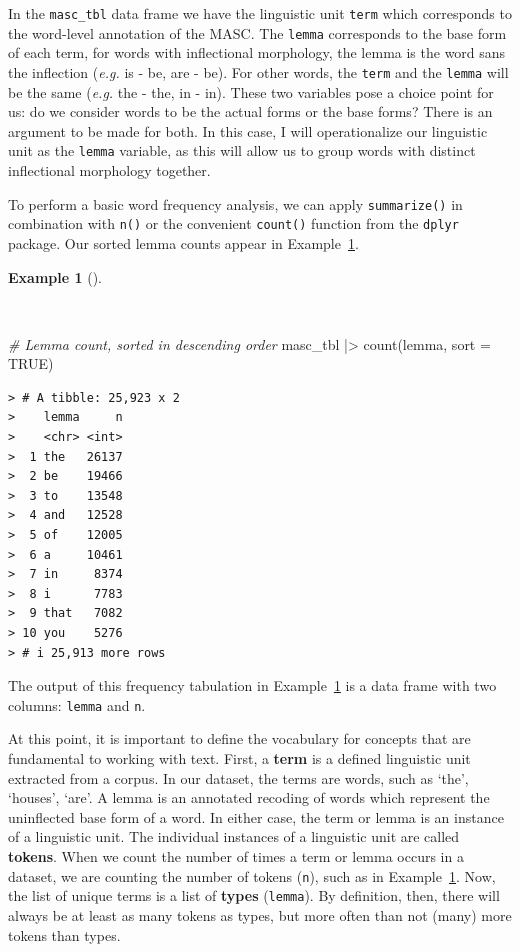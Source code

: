 \documentclass[
  letterpaper,
  DIV=11,
  numbers=noendperiod]{scrreprt}
\newenvironment{Shaded}{\begin{snugshade}}{\end{snugshade}}
\newcommand{\AttributeTok}[1]{\textcolor[rgb]{0.00,0.00,0.00}{#1}}
\newcommand{\CommentTok}[1]{\textcolor[rgb]{0.00,0.00,0.00}{\textit{#1}}}
\newcommand{\ConstantTok}[1]{\textcolor[rgb]{0.00,0.00,0.00}{#1}}
\newcommand{\FunctionTok}[1]{\textcolor[rgb]{0.00,0.00,0.00}{#1}}
\newcommand{\NormalTok}[1]{\textcolor[rgb]{0.00,0.00,0.00}{#1}}
\newcommand{\SpecialCharTok}[1]{\textcolor[rgb]{0.00,0.00,0.00}{#1}}
\theoremstyle{definition}
\newtheorem{example}{Example}[chapter]
\theoremstyle{remark}
\begin{document}
In the \texttt{masc\_tbl} data frame we have the linguistic unit
\texttt{term} which corresponds to the word-level annotation of the
MASC. The \texttt{lemma} corresponds to the base form of each term, for
words with inflectional morphology, the lemma is the word sans the
inflection (\emph{e.g.} is - be, are - be). For other words, the
\texttt{term} and the \texttt{lemma} will be the same (\emph{e.g.} the -
the, in - in). These two variables pose a choice point for us: do we
consider words to be the actual forms or the base forms? There is an
argument to be made for both. In this case, I will operationalize our
linguistic unit as the \texttt{lemma} variable, as this will allow us to
group words with distinct inflectional morphology together.

To perform a basic word frequency analysis, we can apply
\texttt{summarize()} in combination with \texttt{n()} or the convenient
\texttt{count()} function from the \texttt{dplyr} package. Our sorted
lemma counts appear in Example~\ref{exm-eda-masc-count}.

\begin{example}[]\protect\hypertarget{exm-eda-masc-count}{}\label{exm-eda-masc-count}

~

\begin{Shaded}
\begin{Highlighting}[]
\CommentTok{\# Lemma count, sorted in descending order}
\NormalTok{masc\_tbl }\SpecialCharTok{|\textgreater{}}
  \FunctionTok{count}\NormalTok{(lemma, }\AttributeTok{sort =} \ConstantTok{TRUE}\NormalTok{)}
\end{Highlighting}
\end{Shaded}

\begin{verbatim}
> # A tibble: 25,923 x 2
>    lemma     n
>    <chr> <int>
>  1 the   26137
>  2 be    19466
>  3 to    13548
>  4 and   12528
>  5 of    12005
>  6 a     10461
>  7 in     8374
>  8 i      7783
>  9 that   7082
> 10 you    5276
> # i 25,913 more rows
\end{verbatim}

\end{example}

The output of this frequency tabulation in
Example~\ref{exm-eda-masc-count} is a data frame with two columns:
\texttt{lemma} and \texttt{n}.

At this point, it is important to define the vocabulary for concepts
that are fundamental to working with text. First, a \textbf{term} is a
defined linguistic unit extracted from a corpus. In our dataset, the
terms are words, such as `the', `houses', `are'. A lemma is an annotated
recoding of words which represent the uninflected base form of a word.
In either case, the term or lemma is an instance of a linguistic unit.
The individual instances of a linguistic unit are called
\textbf{tokens}. When we count the number of times a term or lemma
occurs in a dataset, we are counting the number of tokens (\texttt{n}),
such as in Example~\ref{exm-eda-masc-count}. Now, the list of unique
terms is a list of \textbf{types} (\texttt{lemma}). By definition, then,
there will always be at least as many tokens as types, but more often
than not (many) more tokens than types.
\end{document}
